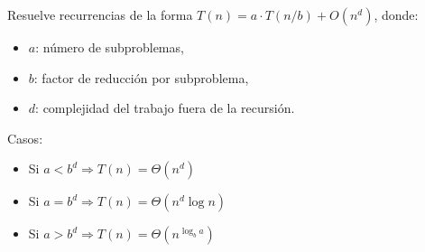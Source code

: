 Resuelve recurrencias de la forma \( T(n) = a \cdot T(n/b) + O(n^d) \), donde:

\begin{itemize}
  \item \(a\): número de subproblemas,
  \item \(b\): factor de reducción por subproblema,
  \item \(d\): complejidad del trabajo fuera de la recursión.
\end{itemize}

Casos:
\begin{itemize}
  \item Si \(a < b^d \Rightarrow T(n) = \Theta(n^d)\)
  \item Si \(a = b^d \Rightarrow T(n) = \Theta(n^d \log n)\)
  \item Si \(a > b^d \Rightarrow T(n) = \Theta(n^{\log_b a})\)
\end{itemize}

